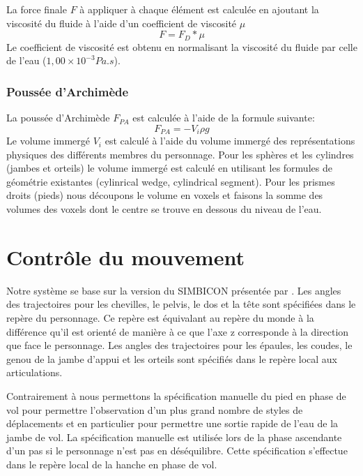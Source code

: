 \documentclass[runningheads,a4paper]{llncs}
\begin{document}
La force finale $F$ à appliquer à chaque élément est calculée en ajoutant la viscosité du fluide à l'aide d'un coefficient de viscosité $\mu$ 
\[
F=F_D*\mu
\]
Le coefficient de viscosité est obtenu en normalisant la viscosité du fluide par celle de l'eau ($1,00 \times 10^{-3} Pa.s$).
%
\subsubsection{Poussée d'Archimède}
%
La poussée d'Archimède $F_{PA}$ est calculée à l'aide de la formule suivante:
\[
F_{PA}=-V_i \rho g
\]
Le volume immergé \(V_i\) est calculé à l'aide du volume immergé des représentations physiques des différents membres du personnage.  Pour les sphères et les cylindres (jambes et orteils) le volume immergé est calculé en utilisant les formules de géométrie existantes (cylinrical wedge, cylindrical segment). Pour les prismes droits (pieds) nous découpons le volume en voxels et faisons la somme des volumes des voxels dont le centre se trouve en dessous du niveau de l'eau.
%
\section{Contrôle du mouvement}
\label{sec:controler}
%
Notre système se base sur la version du SIMBICON présentée par \cite{coros2010generalized}. Les angles des trajectoires pour les chevilles, le pelvis, le dos et la tête sont spécifiées dans le repère du personnage. Ce repère est équivalant au repère du monde à la différence qu'il est orienté de manière à ce que l'axe z corresponde à la direction que face le personnage. Les angles des trajectoires pour les épaules, les coudes, le genou de la jambe d'appui et les orteils sont spécifiés dans le repère local aux articulations.

Contrairement à \cite{coros2010generalized} nous permettons la spécification manuelle du pied en phase de vol pour permettre l'observation d'un plus grand nombre de styles de déplacements et en particulier pour permettre une sortie rapide de l'eau de la jambe de vol. La spécification manuelle est utilisée lors de la phase ascendante d'un pas si le personnage n'est pas en déséquilibre. Cette spécification s'effectue dans le repère local de la hanche en phase de vol.

%
\end{document}
